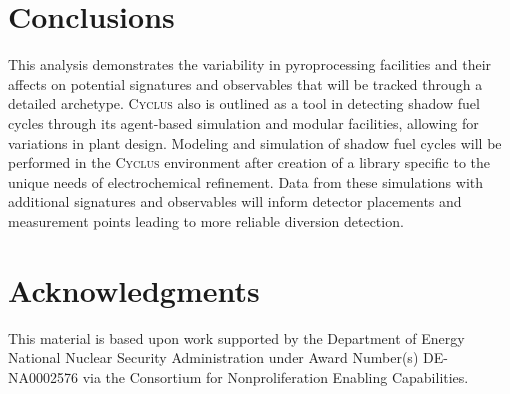 \documentclass{anstrans}
\newcommand{\Cyclus}{\textsc{Cyclus}\xspace}%
\begin{document}
\section{Conclusions}
This analysis demonstrates the variability in pyroprocessing facilities and their affects on potential 
signatures and observables that will be tracked through a detailed archetype. \Cyclus also is outlined as a tool in 
detecting shadow fuel cycles through its agent-based simulation and modular facilities, allowing for variations in 
plant design. Modeling and simulation of shadow fuel cycles will be performed in the \Cyclus environment after 
creation of a library specific to the unique needs of electrochemical refinement. Data from these simulations with 
additional signatures and observables will inform detector placements and measurement points leading to more 
reliable diversion detection.

\section{Acknowledgments}
This material is based upon work supported by the Department of Energy
National Nuclear Security Administration under Award Number(s) DE-NA0002576 via
the Consortium for Nonproliferation Enabling Capabilities.



\end{document}
